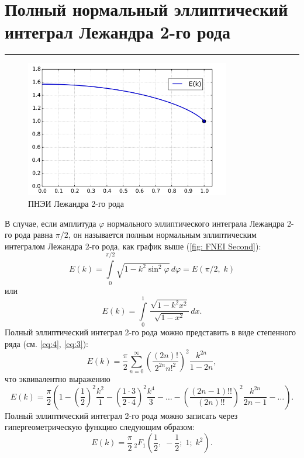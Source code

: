 \documentclass[fleqn]{article}
\begin{document}
	\section{Полный нормальный эллиптический интеграл Лежандра 2-го рода}
	\hrule
	\begin{figure}[h]
		\centering
		\includegraphics[width=0.8\textwidth]{Graphs/SecondEk.png}
		\caption{ПНЭИ Лежандра 2-го рода}
		\label{fig: FNEI Second}
	\end{figure}
	В случае, если амплитуда $\varphi$ нормального эллиптического интеграла Лежандра 2-го рода равна $\pi/2$, он называется полным нормальным эллиптическим интегралом Лежандра 2-го рода, как график выше (\eqref{fig: FNEI Second}):
	 \begin{equation*}E(k)=\int \limits _{0}^{\pi /2}\!{\sqrt {1-k^{2}\sin ^{2}\varphi }}\,d\varphi =E(\pi /2,\;k)\end{equation*}
	 или
	 \begin{equation*}E(k) = \int \limits_{0}^{1}\,\frac{\sqrt{1-k^2 x^2}}{\sqrt{1-x^2}}\,dx.\end{equation*}
	 Полный эллиптический интеграл 2-го рода можно представить в виде степенного ряда (см. \eqref{eq:4}, \eqref{eq:3}):
	 \begin{equation*}E(k)={\frac {\pi }{2}}\sum _{n=0}^{\infty }\left({\frac {(2n)!}{2^{2n}n!^{2}}}\right)^{2}{\frac {k^{2n}}{1-2n}},\end{equation*}
	 что эквивалентно выражению 
	 \begin{equation*}E(k)={\frac {\pi }{2}}\left(1-\left({\frac {1}{2}}\right)^{2}{\frac {k^{2}}{1}}-\left({\frac {1\cdot 3}{2\cdot 4}}\right)^{2}{\frac {k^{4}}{3}}-\ldots -\left({\frac {(2n-1)!!}{(2n)!!}}\right)^{2}{\frac {k^{2n}}{2n-1}}-\ldots \right).\end{equation*}
	 Полный эллиптический интеграл 2-го рода можно записать через гипергеометрическую функцию следующим образом:
	 \begin{equation*}E(k)={\frac {\pi }{2}}\,_{2}F_{1}\left({\frac {1}{2}},\;-{\frac {1}{2}};\;1;\;k^{2}\right).\end{equation*}
\end{document}
